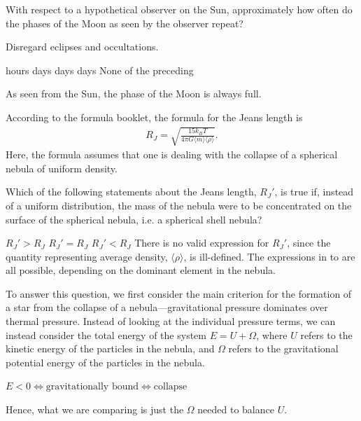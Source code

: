 \documentclass[a4paper,11pt]{exam}
\begin{document}
\begin{questions}
\filbreak
\question
	With respect to a hypothetical observer on the Sun, approximately how often do the phases of the Moon as seen by the observer repeat?

	Disregard eclipses and occultations.

	\begin{oneparchoices}
		 hours
		 days
		 days
		 days
		\correctchoice	None of the preceding
	\end{oneparchoices}
	\begin{solution}
		As seen from the Sun, the phase of the Moon is always full.
	\end{solution}

\filbreak
\question
	According to the formula booklet, the formula for the Jeans length is
	\begin{align*}
		R_J = \sqrt{\frac{15k_{B}T}{4 \pi G\langle m\rangle\langle\rho\rangle}}.
	\end{align*}
	Here, the formula assumes that one is dealing with the collapse of a spherical nebula of uniform density.

	Which of the following statements about the Jeans length, $ R_J' $, is true if, instead of a uniform distribution, the mass of the nebula were to be concentrated on the surface of the spherical nebula, i.e. a spherical shell nebula?
	\begin{choices}
		\choice $ R_{J}' > R_J $
		\choice $ R_{J}' = R_J $
		\correctchoice $ R_J' < R_J $
		\choice There is no valid expression for $ R_J'$, since the quantity representing average density, $ \langle\rho\rangle $, is ill-defined.
		\choice The expressions in  to  are all possible, depending on the dominant element in the nebula.
	\end{choices}
	\begin{solution}
		To answer this question, we first consider the main criterion for the formation of a star from the collapse of a nebula---gravitational pressure dominates over thermal pressure.
		Instead of looking at the individual pressure terms, we can instead consider the total energy of the system $ E = U + \Omega $, where $ U $ refers to the kinetic energy of the particles in the nebula, and $ \Omega $ refers to the gravitational potential energy of the particles in the nebula.

		$ E < 0 \iff \text{gravitationally bound} \iff \text{collapse} $

		Hence, what we are comparing is just the $ \Omega $ needed to balance $ U $.


\end{solution}
\end{questions}
\end{document}
